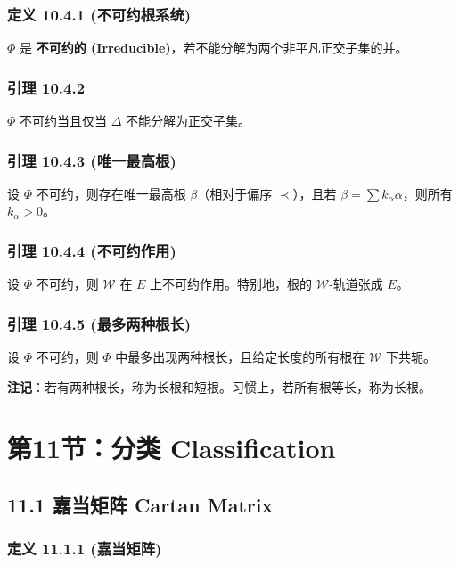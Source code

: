 \subsubsection{定义 10.4.1 (不可约根系统)}

$\Phi$ 是 \textbf{不可约的 (Irreducible)}，若不能分解为两个非平凡正交子集的并。

\subsubsection{引理 10.4.2}

$\Phi$ 不可约当且仅当 $\Delta$ 不能分解为正交子集。

\subsubsection{引理 10.4.3 (唯一最高根)}

设 $\Phi$ 不可约，则存在唯一最高根 $\beta$（相对于偏序 $\prec$），且若 $\beta = \sum k_\alpha \alpha$，则所有 $k_\alpha > 0$。

\subsubsection{引理 10.4.4 (不可约作用)}

设 $\Phi$ 不可约，则 $\mathcal{W}$ 在 $E$ 上不可约作用。特别地，根的 $\mathcal{W}$-轨道张成 $E$。

\subsubsection{引理 10.4.5 (最多两种根长)}

设 $\Phi$ 不可约，则 $\Phi$ 中最多出现两种根长，且给定长度的所有根在 $\mathcal{W}$ 下共轭。

\textbf{注记}：若有两种根长，称为长根和短根。习惯上，若所有根等长，称为长根。


\section{第11节：分类 Classification}

\subsection{11.1 嘉当矩阵 Cartan Matrix}

\subsubsection{定义 11.1.1 (嘉当矩阵)}

